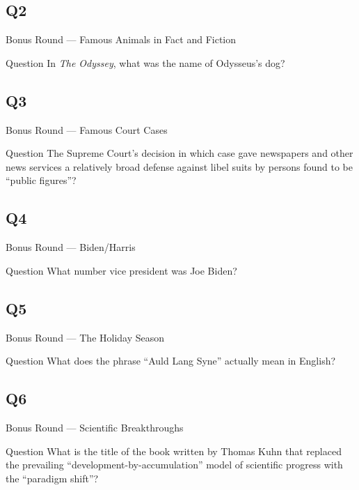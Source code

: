 \documentclass[11pt]{beamer}
\begin{document}
\subsection*{Q2}
\begin{frame}[t]{Bonus Round --- Famous Animals in Fact and Fiction}
\vspace{-0.5em}
\begin{block}{Question}
In \emph{The Odyssey}, what was the name of Odysseus's dog?
\end{block}
\end{frame}
\subsection*{Q3}
\begin{frame}[t]{Bonus Round --- Famous Court Cases}
\vspace{-0.5em}
\begin{block}{Question}
The Supreme Court's decision in which case  gave newspapers and other news services a relatively  broad defense against libel suits by persons found to be ``public figures''?
\end{block}
\end{frame}
\subsection*{Q4}
\begin{frame}[t]{Bonus Round --- Biden/Harris}
\vspace{-0.5em}
\begin{block}{Question}
What number vice president was Joe Biden?
\end{block}
\end{frame}
\subsection*{Q5}
\begin{frame}[t]{Bonus Round --- The Holiday Season}
\vspace{-0.5em}
\begin{block}{Question}
What does the phrase ``Auld Lang Syne'' actually mean in English?
\end{block}
\end{frame}
\subsection*{Q6}
\begin{frame}[t]{Bonus Round --- Scientific Breakthroughs}
\vspace{-0.5em}
\begin{block}{Question}
What is the title of the book written by Thomas Kuhn that replaced the prevailing ``development-by-accumulation'' model of scientific progress with the ``paradigm shift''?
\end{block}
\end{frame}
\end{document}
